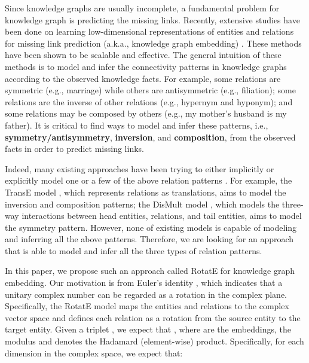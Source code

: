 \documentclass{article} \usepackage{iclr2019_conference,times}
\def\method{RotatE}
\begin{document}
Since knowledge graphs are usually incomplete, a fundamental problem for knowledge graph is predicting the missing links. Recently, extensive studies have been done on learning low-dimensional representations of entities and relations for missing link prediction (a.k.a., knowledge graph embedding) \citep{bordes2013translating,trouillon2016complex,dettmers2017convolutional}.
These methods have been shown to be scalable and effective. The general intuition of these methods is to model and infer the connectivity patterns in knowledge graphs according to the observed knowledge facts. For example, some relations are symmetric (e.g., marriage) while others are antisymmetric (e.g., filiation); 
some relations are the inverse of other relations (e.g., hypernym and hyponym); 
and some relations may be composed by others (e.g., my mother's husband is my father). It is critical to find ways to model and infer these patterns, i.e., \textbf{symmetry/antisymmetry}, \textbf{inversion}, and \textbf{composition}, from the observed facts in order to predict missing links. 





Indeed, many existing approaches have been trying to either implicitly or explicitly model one or a few of the above relation patterns \citep{bordes2013translating,wang2014knowledge,lin2015learning,yang2014embedding,trouillon2016complex}. 
For example, the TransE model \citep{bordes2011learning}, which represents relations as translations, aims to model the inversion and composition patterns; the DisMult model \citep{yang2014embedding}, which models the three-way interactions between head entities, relations, and tail entities, aims to model the symmetry pattern. However, none of existing models is capable of modeling and inferring all the above patterns. Therefore, we are looking for an approach that is able to model and infer all the three types of relation patterns. 



In this paper, we propose such an approach called \method{} for knowledge graph embedding.
Our motivation is from Euler's identity , which indicates that a unitary complex number can be regarded as a rotation in the complex plane.
Specifically, the \method{} model maps the entities and relations to the complex vector space and defines each relation as a rotation from the source entity to the target entity. Given a triplet , we expect that , where  are the embeddings, the modulus  and  denotes the Hadamard (element-wise) product. Specifically, for each dimension in the complex space, we expect that:
\end{document}
